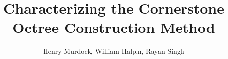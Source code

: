 \documentclass[sigplan,screen,10pt]{acmart}
\begin{document}
\title{Characterizing the Cornerstone Octree Construction Method}

\author{Henry Murdock, William Halpin, Rayan Singh}



\maketitle











\end{document}
